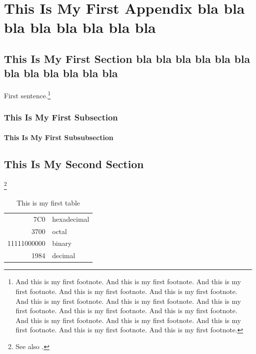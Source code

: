 % 

\chapter{This Is My First Appendix bla bla bla bla bla bla bla bla}
\section{This Is My First Section bla bla bla bla bla bla bla bla bla bla bla bla }
\noindent
First sentence.\footnote{And this is my first footnote. And this is my first footnote. And this is my first footnote. And this is my first footnote. And this is my first footnote. And this is my first footnote. And this is my first footnote. And this is my first footnote. And this is my first footnote. And this is my first footnote. And this is my first footnote. And this is my first footnote. And this is my first footnote. And this is my first footnote. And this is my first footnote.}

\subsection{This Is My First Subsection}
\noindent
\cite{texbook} 







\subsubsection{This Is My First Subsubsection}
\noindent
\cite{texbook}







\section{This Is My Second Section}
\noindent
\footnote{See also \cite{Aup91,Dou72,Hal82}.}








\begin{table}[h]
  \begin{center}
\begin{tabular}{|r|l|}
  \hline
  7C0 & hexadecimal \\
  3700 & octal \\ \cline{2-2}
  11111000000 & binary \\
  \hline \hline
  1984 & decimal \\
  \hline
\end{tabular}
\caption{This is my first table}
\end{center}
\end{table}


